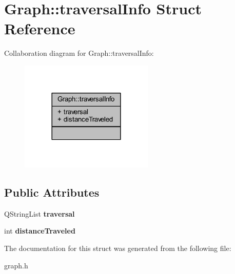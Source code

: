 \hypertarget{struct_graph_1_1traversal_info}{}\section{Graph\+:\+:traversal\+Info Struct Reference}
\label{struct_graph_1_1traversal_info}


Collaboration diagram for Graph\+:\+:traversal\+Info\+:
\nopagebreak
\begin{figure}[H]
\begin{center}
\leavevmode
\includegraphics[width=180pt]{struct_graph_1_1traversal_info__coll__graph}
\end{center}
\end{figure}
\subsection*{Public Attributes}
\begin{DoxyCompactItemize}
\item 
\mbox{\label{struct_graph_1_1traversal_info_a6cc0cefaf64ee80392f52df1e3b98718}} 
Q\+String\+List {\bfseries traversal}
\item 
\mbox{\label{struct_graph_1_1traversal_info_aad37277396b6c83b5e1ea23d5052e098}} 
int {\bfseries distance\+Traveled}
\end{DoxyCompactItemize}


The documentation for this struct was generated from the following file\+:\begin{DoxyCompactItemize}
\item 
graph.\+h\end{DoxyCompactItemize}
